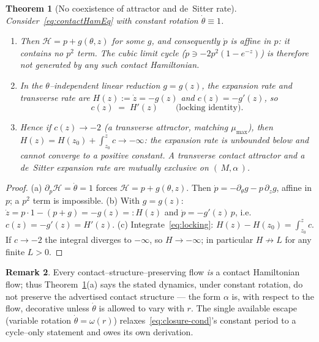 \documentclass[11pt]{article}
\theoremstyle{plain}
\newtheorem{theorem}{Theorem}
\theoremstyle{definition}
\newtheorem{remark}[theorem]{Remark}
\begin{document}
\begin{theorem}[No coexistence of attractor and de~Sitter rate]\label{thm:nogo}
Consider~\eqref{eq:contactHamEq} with constant rotation $\dot\theta\equiv1$.
\begin{enumerate}[label=(\alph*),leftmargin=2.4em]
\item Then $\mathcal H=p+g(\theta,z)$ for some $g$, and consequently $\dot p$ is
affine in $p$: it contains no $p^2$ term. The cubic limit cycle
($\dot p\ni-2p^2(1-e^{-z})$) is therefore \emph{not} generated by any such
contact Hamiltonian.
\item In the $\theta$--independent linear reduction $g=g(z)$, the expansion
rate and transverse rate are $H(z):=\dot z=-g(z)$ and $c(z)=-g'(z)$, so
\begin{equation}\label{eq:locking}
c(z)\;=\;H'(z)\qquad\text{(locking identity).}
\end{equation}
\item Hence if $c(z)\to-2$ (a transverse attractor, matching $\mu_{\max}$),
then $H(z)=H(z_0)+\int_{z_0}^{z}c\to-\infty$: the expansion rate is unbounded
below and cannot converge to a positive constant. A transverse contact
attractor and a de~Sitter expansion rate are mutually exclusive on
$(\,M,\alpha\,)$.
\end{enumerate}
\end{theorem}

\begin{proof}
(a) $\partial_p\mathcal H=\dot\theta=1$ forces $\mathcal H=p+g(\theta,z)$.
Then $\dot p=-\partial_\theta g-p\,\partial_z g$, affine in $p$; a $p^2$
term is impossible. (b) With $g=g(z)$: $\dot z=p\cdot1-(p+g)=-g(z)=:H(z)$ and
$\dot p=-g'(z)\,p$, i.e.\ $c(z)=-g'(z)=H'(z)$. (c) Integrate~\eqref{eq:locking}:
$H(z)-H(z_0)=\int_{z_0}^z c$. If $c\to-2$ the integral diverges to $-\infty$,
so $H\to-\infty$; in particular $H\not\to L$ for any finite $L>0$.
\end{proof}

\begin{remark}
Every contact--structure--preserving flow \emph{is} a contact Hamiltonian flow;
thus Theorem~\ref{thm:nogo}(a) says the stated dynamics, under constant
rotation, do not preserve the advertised contact structure --- the form
$\alpha$ is, with respect to the flow, decorative unless $\dot\theta$ is allowed
to vary with $r$. The single available escape (variable rotation
$\dot\theta=\omega(r)$) relaxes~\eqref{eq:closure-cond}'s constant period to a
cycle--only statement and owes its own derivation.
\end{remark}
\end{document}
